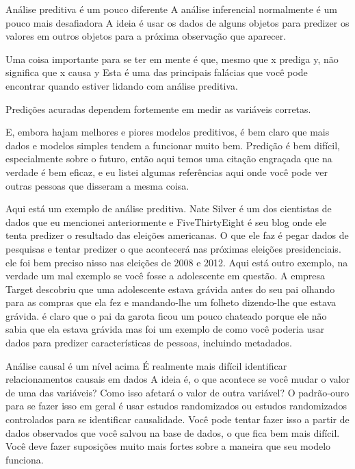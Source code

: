 Análise preditiva é um pouco diferente A análise inferencial normalmente é um pouco mais desafiadora A ideia é usar os dados de alguns objetos para predizer os valores em outros objetos para a próxima observação que aparecer. 

Uma coisa importante para se ter em mente é que, mesmo que x prediga y, não significa que x causa y Esta é uma das principais falácias que você pode encontrar quando estiver lidando com análise preditiva. 

Predições acuradas dependem fortemente em medir as variáveis corretas. 

E, embora hajam melhores e piores modelos preditivos, é bem claro que mais dados e modelos simples tendem a funcionar muito bem. Predição é bem difícil, especialmente sobre o futuro, então aqui temos uma citação engraçada que na verdade é bem eficaz, e eu listei algumas referências aqui onde você pode ver outras pessoas que disseram a mesma coisa. 

Aqui está um exemplo de análise preditiva. Nate Silver é um dos cientistas de dados que eu mencionei anteriormente e FiveThirtyEight é seu blog onde ele tenta predizer o resultado das eleições americanas. O que ele faz é pegar dados de pesquisas e tentar predizer o que acontecerá nas próximas eleições presidenciais. ele foi bem preciso nisso nas eleições de 2008 e 2012. Aqui está outro exemplo, na verdade  um mal exemplo se você fosse a adolescente em questão. A empresa Target descobriu que uma adolescente  estava grávida antes do seu pai olhando para as compras que ela fez e mandando-lhe um folheto dizendo-lhe que estava grávida. é claro que o pai da garota ficou um pouco chateado porque ele não sabia que ela estava grávida mas foi um exemplo de como você poderia usar dados para predizer características de pessoas, incluindo metadados. 

Análise causal é um nível acima É realmente mais difícil identificar relacionamentos causais em dados A ideia é, o que acontece se você mudar o valor de uma das variáveis? Como isso afetará o valor de outra variável? O padrão-ouro para se fazer isso em geral é usar estudos randomizados ou estudos randomizados controlados para se identificar causalidade. Você pode tentar fazer isso a partir de dados observados que você salvou na base de dados, o que fica bem mais difícil. Você deve fazer suposições muito mais fortes sobre a maneira que seu modelo funciona. 

